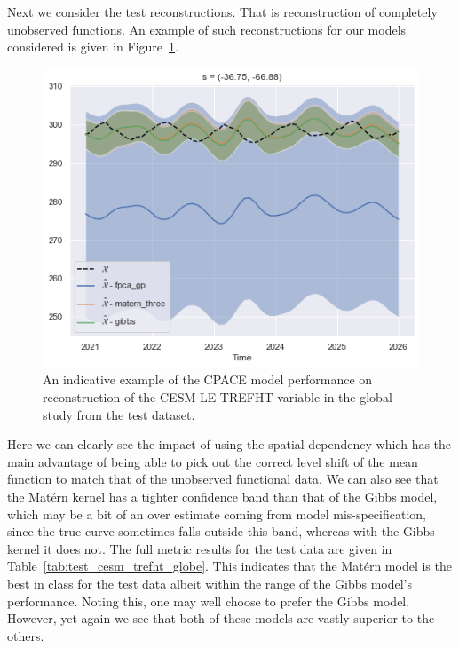 Next we consider the test reconstructions.
That is reconstruction of completely unobserved functions. 
An example of such reconstructions for our models considered is given in Figure~\ref{fig:test_ex_trefht_globe}.

\begin{figure}
	\centering
	\includegraphics[width=\textwidth]{test_ex_trefht_globe}
	\caption[An indicative example of the CPACE model performance on reconstruction of the CESM-LE TREFHT variable in the global study from the test dataset.]{An indicative example of the CPACE model performance on reconstruction of the CESM-LE TREFHT variable in the global study from the test dataset.}
	\label{fig:test_ex_trefht_globe}
\end{figure}

Here we can clearly see the impact of using the spatial dependency which has the main advantage of being able to pick out the correct level shift of the mean function to match that of the unobserved functional data. 
We can also see that the Mat\'ern kernel has a tighter confidence band than that of the Gibbs model, which may be a bit of an over estimate coming from model mis-specification, since the true curve sometimes falls outside this band, whereas with the Gibbs kernel  it does not. 
The full metric results for the test data are given in Table~\ref{tab:test_cesm_trefht_globe}. 
This indicates that the Mat\'ern model is the best in class for the test data albeit within the range of the Gibbs model's performance. 
Noting this, one may well choose to prefer the Gibbs model.
However, yet again we see that both of these models are vastly superior to the others.

